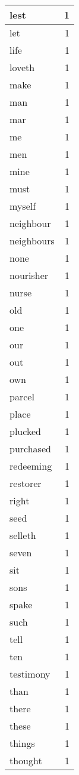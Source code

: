 \begin{center}
\begin{longtable}{l|r}
lest & 1 \\ \hline
let & 1 \\ \hline
life & 1 \\ \hline
loveth & 1 \\ \hline
make & 1 \\ \hline
man & 1 \\ \hline
mar & 1 \\ \hline
me & 1 \\ \hline
men & 1 \\ \hline
mine & 1 \\ \hline
must & 1 \\ \hline
myself & 1 \\ \hline
neighbour & 1 \\ \hline
neighbours & 1 \\ \hline
none & 1 \\ \hline
nourisher & 1 \\ \hline
nurse & 1 \\ \hline
old & 1 \\ \hline
one & 1 \\ \hline
our & 1 \\ \hline
out & 1 \\ \hline
own & 1 \\ \hline
parcel & 1 \\ \hline
place & 1 \\ \hline
plucked & 1 \\ \hline
purchased & 1 \\ \hline
redeeming & 1 \\ \hline
restorer & 1 \\ \hline
right & 1 \\ \hline
seed & 1 \\ \hline
selleth & 1 \\ \hline
seven & 1 \\ \hline
sit & 1 \\ \hline
sons & 1 \\ \hline
spake & 1 \\ \hline
such & 1 \\ \hline
tell & 1 \\ \hline
ten & 1 \\ \hline
testimony & 1 \\ \hline
than & 1 \\ \hline
there & 1 \\ \hline
these & 1 \\ \hline
things & 1 \\ \hline
thought & 1 \\ \hline

\end{longtable}
\end{center}
